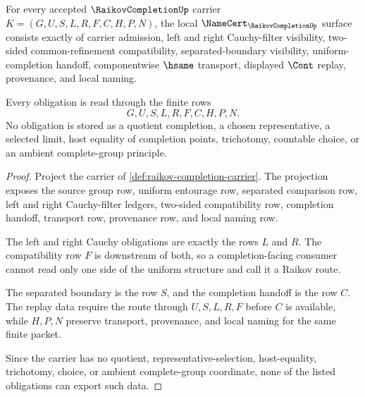\begin{theorem}
\label{thm:raikov-completion-namecert-obligations}
For every accepted $\RaikovCompletionUp$ carrier $K=(G,U,S,L,R,F,C,H,P,N)$, the local $\NameCert_{\RaikovCompletionUp}$ surface consists exactly of carrier admission, left and right Cauchy-filter visibility, two-sided common-refinement compatibility, separated-boundary visibility, uniform-completion handoff, componentwise $\hsame$ transport, displayed $\Cont$ replay, provenance, and local naming.

Every obligation is read through the finite rows
$$
G,U,S,L,R,F,C,H,P,N .
$$
No obligation is stored as a quotient completion, a chosen representative, a selected limit, host equality of completion points, trichotomy, countable choice, or an ambient complete-group principle.
\end{theorem}
\begin{proof}
Project the carrier of \autoref{def:raikov-completion-carrier}. The projection exposes the source group row, uniform entourage row, separated comparison row, left and right Cauchy-filter ledgers, two-sided compatibility row, completion handoff, transport row, provenance row, and local naming row.

The left and right Cauchy obligations are exactly the rows $L$ and $R$. The compatibility row $F$ is downstream of both, so a completion-facing consumer cannot read only one side of the uniform structure and call it a Raikov route.

The separated boundary is the row $S$, and the completion handoff is the row $C$. The replay data require the route through $U,S,L,R,F$ before $C$ is available, while $H,P,N$ preserve transport, provenance, and local naming for the same finite packet.

Since the carrier has no quotient, representative-selection, host-equality, trichotomy, choice, or ambient complete-group coordinate, none of the listed obligations can export such data.
\end{proof}

